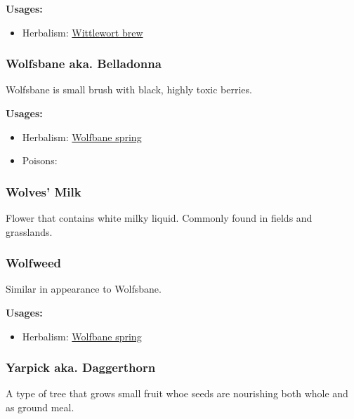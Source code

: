 \textbf{Usages:}

\begin{itemize}[noitemsep]
\item[] Herbalism: \hyperref[Wittlewort brew]{Wittlewort brew}
\end{itemize}

\subsubsection{Wolfsbane aka. Belladonna}
\label{Wolfsbane}

Wolfsbane is small brush with black, highly toxic berries.

\vspace{5mm}

\textbf{Usages:}

\begin{itemize}[noitemsep]
\item[] Herbalism: \hyperref[Wolfbane spring]{Wolfbane spring}
\item[] Poisons: \poison\poison
\end{itemize}

\subsubsection{Wolves' Milk}

Flower that contains white milky liquid. Commonly found in fields and grasslands.

\subsubsection{Wolfweed}
\label{Wolfweed}

Similar in appearance to Wolfsbane.

\vspace{5mm}

\textbf{Usages:}

\begin{itemize}[noitemsep]
\item[] Herbalism: \hyperref[Wolfbane spring]{Wolfbane spring}
\end{itemize}

\subsubsection{Yarpick aka. Daggerthorn}

A type of tree that grows small fruit whoe seeds are nourishing both whole and as ground meal.

